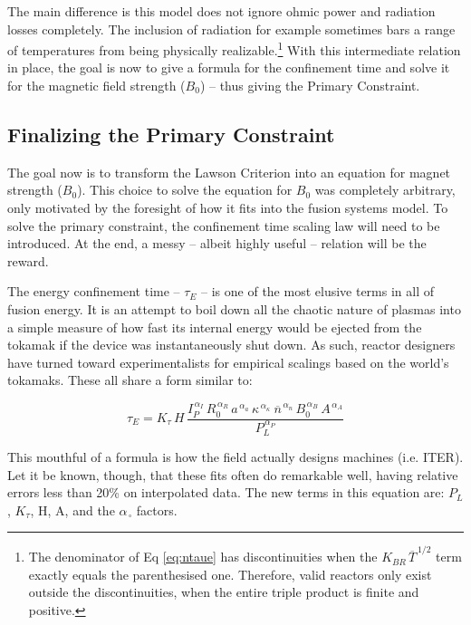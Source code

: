 The main difference is this model does not ignore ohmic power and radiation losses completely. The inclusion of radiation for example sometimes bars a range of temperatures from being physically realizable.\footnote{ The denominator of Eq \ref{eq:ntaue} has discontinuities when the $K_{BR} \, \overline{T}^{  \,1/2 }$ term exactly equals the parenthesised one. Therefore, valid reactors only exist outside the discontinuities, when the entire triple product is finite and positive. } With this intermediate relation in place, the goal is now to give a formula for the confinement time and solve it for the magnetic field strength ($B_0$) -- thus giving the Primary Constraint.

\subsection{Finalizing the Primary Constraint}

The goal now is to transform the Lawson Criterion into an equation for magnet strength ($B_0$). This choice to solve the equation for $B_0$ was completely arbitrary, only motivated by the foresight of how it fits into the fusion systems model. To solve the primary constraint, the confinement time scaling law will need to be introduced. At the end, a messy -- albeit highly useful -- relation will be the reward.

The energy confinement time -- $\tau_E$ -- is one of the most elusive terms in all of fusion energy. It is an attempt to boil down all the chaotic nature of plasmas into a simple measure of how fast its internal energy would be ejected from the tokamak if the device was instantaneously shut down. As such, reactor designers have turned toward experimentalists for empirical scalings based on the world's tokamaks. These all share a form similar to:

\begin{equation}
	\tau_E = K_\tau \, H \, \frac{
		I_P^{\,\alpha_I} \, R_0^{\,\alpha_R} \, a^{\,\alpha_a} \, \kappa^{\,\alpha_\kappa} \ \overline{n}^{\,\alpha_n} \, B_0^{\,\alpha_B} \, A^{\,\alpha_A}
	}{ P_L ^ {\,\alpha_P} }
	\label{eq:tau_gen}
\end{equation}

This mouthful of a formula is how the field actually designs machines (i.e. ITER). Let it be known, though, that these fits often do remarkable well, having relative errors less than 20\% on interpolated data. The new terms in this equation are: $P_L$, $K_\tau$, H, A, and the $\alpha_{\,\square}$ factors. 

